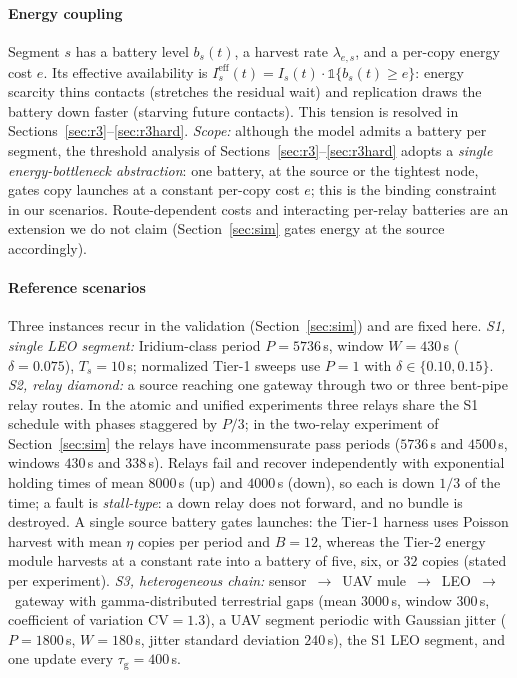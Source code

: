 \documentclass[twocolumn,3p,times,procedia]{elsarticle}
\theoremstyle{plain}
\theoremstyle{remark}
\newcommand{\ind}{\mathbb{1}}
\newcommand{\GEN}{\tau_{\mathrm{g}}}
\begin{document}
\paragraph*{Energy coupling}
Segment $s$ has a battery level $b_s(t)$, a harvest rate
$\lambda_{e,s}$, and a per-copy energy cost $e$. Its effective
availability is $I^{\mathrm{eff}}_s(t)=I_s(t)\cdot
\ind\{b_s(t)\ge e\}$: energy scarcity thins contacts (stretches the
residual wait) and replication draws the battery down faster (starving
future contacts). This tension is resolved in
Sections~\ref{sec:r3}--\ref{sec:r3hard}. \emph{Scope:} although the
model admits a battery per segment, the threshold analysis of
Sections~\ref{sec:r3}--\ref{sec:r3hard} adopts a \emph{single
energy-bottleneck abstraction}: one battery, at the source or the
tightest node, gates copy launches at a constant per-copy cost $e$; this
is the binding constraint in our scenarios. Route-dependent costs and
interacting per-relay batteries are an extension we do not claim
(Section~\ref{sec:sim} gates energy at the source accordingly).

\paragraph*{Reference scenarios}
Three instances recur in the validation (Section~\ref{sec:sim}) and
are fixed here. \emph{S1, single LEO segment:} Iridium-class period
$P{=}5736$\,s, window $W{=}430$\,s ($\delta{=}0.075$), $T_s{=}10$\,s;
normalized Tier-1 sweeps use $P{=}1$ with $\delta\in\{0.10,0.15\}$.
\emph{S2, relay diamond:} a source reaching one gateway through two or
three bent-pipe relay routes. In the atomic and unified experiments
three relays share the S1 schedule with phases staggered by $P/3$; in
the two-relay experiment of Section~\ref{sec:sim} the relays have
incommensurate pass periods ($5736$\,s and $4500$\,s, windows $430$\,s
and $338$\,s). Relays fail and recover independently with exponential
holding times of mean $8000$\,s (up) and $4000$\,s (down), so each is
down $1/3$ of the time; a fault is \emph{stall-type}: a down relay does
not forward, and no bundle is destroyed. A single source battery gates
launches: the Tier-1 harness uses Poisson harvest with mean $\eta$
copies per period and $B{=}12$, whereas the Tier-2 energy module
harvests at a constant rate into a battery of five, six, or $32$ copies
(stated per experiment). \emph{S3,
heterogeneous chain:} sensor~$\to$~UAV mule~$\to$~LEO~$\to$~gateway with
gamma-distributed terrestrial gaps (mean $3000$\,s, window $300$\,s,
coefficient of variation $\mathrm{CV}{=}1.3$), a UAV segment periodic with Gaussian jitter
($P{=}1800$\,s, $W{=}180$\,s, jitter standard deviation $240$\,s), the
S1 LEO segment, and one update every $\GEN{=}400$\,s.
\end{document}
